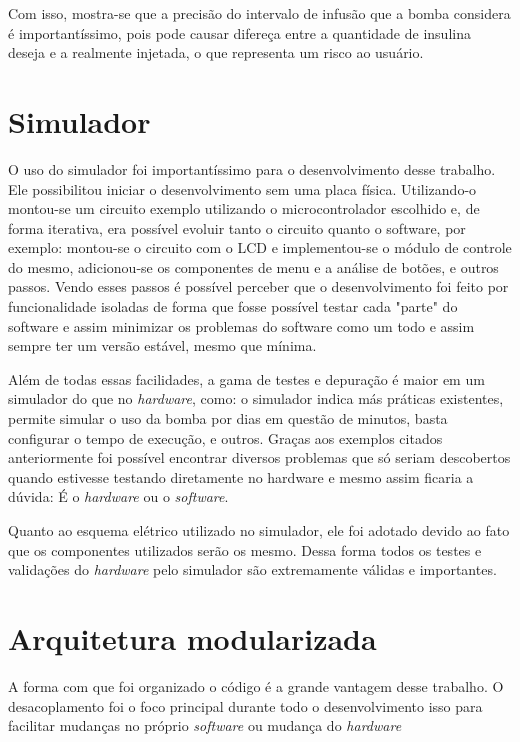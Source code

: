Com isso, mostra-se que a precisão do intervalo de infusão que a bomba considera é importantíssimo, pois pode causar difereça entre a quantidade de insulina deseja e a realmente injetada, o que representa um risco ao usuário.

\section{Simulador}

O uso do simulador foi importantíssimo para o desenvolvimento desse trabalho. Ele possibilitou iniciar o desenvolvimento sem uma placa física. Utilizando-o montou-se um circuito exemplo utilizando o microcontrolador escolhido e, de forma iterativa, era possível evoluir tanto o circuito quanto o software, por exemplo: montou-se o circuito com o LCD e implementou-se o módulo de controle do mesmo, adicionou-se os componentes de menu e a análise de botões, e outros passos. Vendo esses passos é possível perceber que o desenvolvimento foi feito por funcionalidade isoladas de forma que fosse possível testar cada "parte" do software e assim minimizar os problemas do software como um todo e assim sempre ter um versão estável, mesmo que mínima.

Além de todas essas facilidades, a gama de testes e depuração é maior em um simulador do que no \emph{hardware}, como: o simulador indica más práticas existentes, permite simular o uso da bomba por dias em questão de minutos, basta configurar o tempo de execução, e outros. Graças aos exemplos citados anteriormente foi possível encontrar diversos problemas que só seriam descobertos quando estivesse testando diretamente no hardware e mesmo assim ficaria a dúvida: É o \emph{hardware} ou o \emph{software}.

Quanto ao esquema elétrico utilizado no simulador, ele foi adotado devido ao fato que os componentes utilizados serão os mesmo. Dessa forma todos os testes e validações do \emph{hardware} pelo simulador são extremamente válidas e importantes.

\section{Arquitetura modularizada}

A forma com que foi organizado o código é a grande vantagem desse trabalho. O desacoplamento foi o foco principal durante todo o desenvolvimento isso para facilitar mudanças no próprio \emph{software} ou mudança do \emph{hardware}

